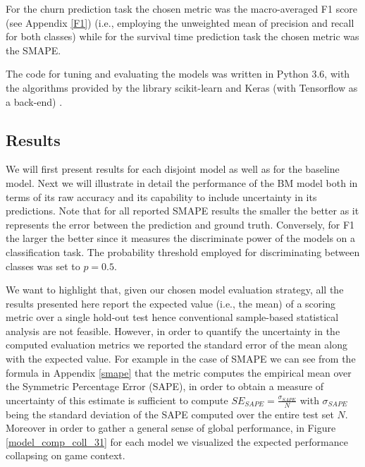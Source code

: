 For the churn prediction task the chosen metric was the macro-averaged F1 score (see Appendix \ref{F1}) (i.e., employing the unweighted mean of precision and recall for both classes) while for the survival time prediction task the chosen metric was the SMAPE. 

The code for tuning and evaluating the models was written in Python 3.6, with the algorithms provided by the library scikit-learn \cite{scikit-learn} and  Keras (with Tensorflow as a back-end) \cite{chollet2015keras}.

\subsection{Results}
\label{results_1}
We will first present results for each disjoint model as well as for the baseline model. Next we will illustrate in detail the performance of the BM model both in terms of its raw accuracy and its capability to include uncertainty in its predictions. Note that for all reported SMAPE results the smaller the better as it represents the error between the prediction and ground truth. Conversely, for F1 the larger the better since it measures the discriminate power of the models on a classification task. The probability threshold employed for discriminating between classes was set to $p=0.5$. 

We want to highlight that, given our chosen model evaluation strategy, all the results presented here report the expected value (i.e., the mean) of a scoring metric over a single hold-out test hence conventional sample-based statistical analysis are not feasible. However, in order to quantify the uncertainty in the computed evaluation metrics we reported the standard error of the mean along with the expected value. For example in the case of SMAPE we can see from the formula in Appendix \ref{smape} that the metric computes the empirical mean over the Symmetric Percentage Error (SAPE), in order to obtain a measure of uncertainty of this estimate is sufficient to compute $SE_{SAPE} = \frac{\sigma_{SAPE}}{N}$ with $\sigma_{SAPE}$ being the standard deviation of the SAPE computed over the entire test set $N$. Moreover in order to gather a general sense of global performance, in Figure \ref{model_comp_coll_31} for each model we visualized the expected performance collapsing on game context.

